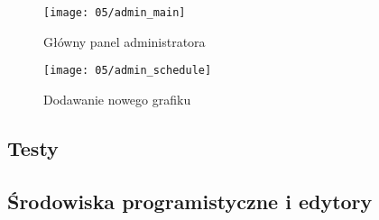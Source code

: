 \newpage

\begin{figure}[p]
	\begin{center}
		\texttt{[image: 05/admin\_main]}
	\end{center}
	\caption{Główny panel administratora}
	\label{serwer_admin}
\end{figure}

\begin{figure}[p]
	\begin{center}
		\texttt{[image: 05/admin\_schedule]}
	\end{center}
	\caption{Dodawanie nowego grafiku}
	\label{serwer_schedule}
\end{figure}

\clearpage

\subsection{Testy}



\subsection{Środowiska programistyczne i edytory}

